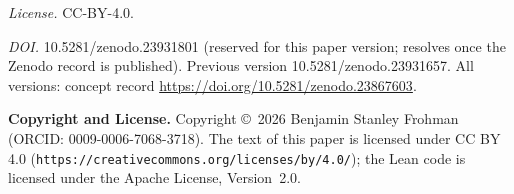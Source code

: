 \documentclass[11pt,a4paper]{article}
\theoremstyle{definition}
\theoremstyle{remark}
\begin{document}
\noindent\textit{License.} CC-BY-4.0.

\noindent\textit{DOI.} 10.5281/zenodo.23931801 (reserved for this paper version; resolves once the Zenodo record is published). Previous version 10.5281/zenodo.23931657. All versions: concept record \url{https://doi.org/10.5281/zenodo.23867603}.


\bigskip\noindent\textbf{Copyright and License.} Copyright \copyright\ 2026 Benjamin Stanley Frohman (ORCID: 0009-0006-7068-3718). The text of this paper is licensed under CC BY 4.0 (\texttt{https://creativecommons.org/licenses/by/4.0/}); the Lean code is licensed under the Apache License, Version~2.0.
\end{document}
